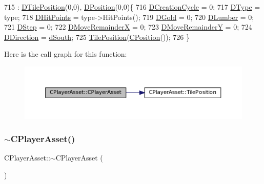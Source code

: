 \begin{DoxyCode}
715                                                                  : \hyperlink{classCPlayerAsset_a5b59a9d3b7db8c7fa194b80dafb96186}{DTilePosition}(0,0), 
      \hyperlink{classCPlayerAsset_aa9f53c009b181c7c5647c6b03776a04c}{DPosition}(0,0)\{
716     \hyperlink{classCPlayerAsset_a8b0efb3ddc27ee11f331ade667bc4b0d}{DCreationCycle} = 0;
717     \hyperlink{classCPlayerAsset_a5d61f73471e1e6f0a6ab15f2ffa7b359}{DType} = type;
718     \hyperlink{classCPlayerAsset_a331750935bf594e665544085fb74e89d}{DHitPoints} = type->HitPoints();
719     \hyperlink{classCPlayerAsset_ab90ebdc73c6794fd44ddbe273f610292}{DGold} = 0;
720     \hyperlink{classCPlayerAsset_af726ea7df9596f02cdb1428d61186349}{DLumber} = 0;
721     \hyperlink{classCPlayerAsset_a7964d2161d51b3edd66fbc9c59eba4b0}{DStep} = 0;
722     \hyperlink{classCPlayerAsset_aa57d93e239e9a80c362949f260471456}{DMoveRemainderX} = 0;
723     \hyperlink{classCPlayerAsset_a282502fea7d02e38aa40a538a9c1565e}{DMoveRemainderY} = 0;
724     \hyperlink{classCPlayerAsset_a2f07e280268d0402220c583d1029d683}{DDirection} = \hyperlink{GameDataTypes_8h_acb2b033915f6659a71a38b5aa6e4eb42ab97d9c3d0f527d3f74de60cc1889ecd0}{dSouth};
725     \hyperlink{classCPlayerAsset_a23354232e5585574bc8e12c1fdb37ad9}{TilePosition}(\hyperlink{classCPosition}{CPosition}());
726 \}
\end{DoxyCode}
Here is the call graph for this function\+:\nopagebreak
\begin{figure}[H]
\begin{center}
\leavevmode
\includegraphics[width=350pt]{classCPlayerAsset_a84787ab2502e70d52c5b73b51ba9063a_cgraph}
\end{center}
\end{figure}
\hypertarget{classCPlayerAsset_a5dbb83d6431454644f98d46c6348dfb8}{}\label{classCPlayerAsset_a5dbb83d6431454644f98d46c6348dfb8} 
\subsubsection{\texorpdfstring{$\sim$\+C\+Player\+Asset()}{~CPlayerAsset()}}
{\footnotesize\ttfamily C\+Player\+Asset\+::$\sim$\+C\+Player\+Asset (\begin{DoxyParamCaption}{ }\end{DoxyParamCaption})}



